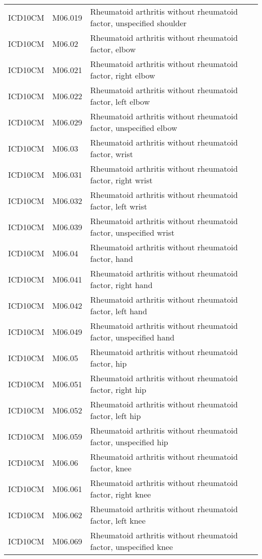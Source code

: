 \begin{longtable}{p{}p{}p{}}
  ICD10CM & M06.019 & Rheumatoid arthritis without rheumatoid factor, unspecified shoulder \\ 
  ICD10CM & M06.02 & Rheumatoid arthritis without rheumatoid factor, elbow \\ 
  ICD10CM & M06.021 & Rheumatoid arthritis without rheumatoid factor, right elbow \\ 
  ICD10CM & M06.022 & Rheumatoid arthritis without rheumatoid factor, left elbow \\ 
  ICD10CM & M06.029 & Rheumatoid arthritis without rheumatoid factor, unspecified elbow \\ 
  ICD10CM & M06.03 & Rheumatoid arthritis without rheumatoid factor, wrist \\ 
  ICD10CM & M06.031 & Rheumatoid arthritis without rheumatoid factor, right wrist \\ 
  ICD10CM & M06.032 & Rheumatoid arthritis without rheumatoid factor, left wrist \\ 
  ICD10CM & M06.039 & Rheumatoid arthritis without rheumatoid factor, unspecified wrist \\ 
  ICD10CM & M06.04 & Rheumatoid arthritis without rheumatoid factor, hand \\ 
  ICD10CM & M06.041 & Rheumatoid arthritis without rheumatoid factor, right hand \\ 
  ICD10CM & M06.042 & Rheumatoid arthritis without rheumatoid factor, left hand \\ 
  ICD10CM & M06.049 & Rheumatoid arthritis without rheumatoid factor, unspecified hand \\ 
  ICD10CM & M06.05 & Rheumatoid arthritis without rheumatoid factor, hip \\ 
  ICD10CM & M06.051 & Rheumatoid arthritis without rheumatoid factor, right hip \\ 
  ICD10CM & M06.052 & Rheumatoid arthritis without rheumatoid factor, left hip \\ 
  ICD10CM & M06.059 & Rheumatoid arthritis without rheumatoid factor, unspecified hip \\ 
  ICD10CM & M06.06 & Rheumatoid arthritis without rheumatoid factor, knee \\ 
  ICD10CM & M06.061 & Rheumatoid arthritis without rheumatoid factor, right knee \\ 
  ICD10CM & M06.062 & Rheumatoid arthritis without rheumatoid factor, left knee \\ 
  ICD10CM & M06.069 & Rheumatoid arthritis without rheumatoid factor, unspecified knee \\ 

\end{longtable}
